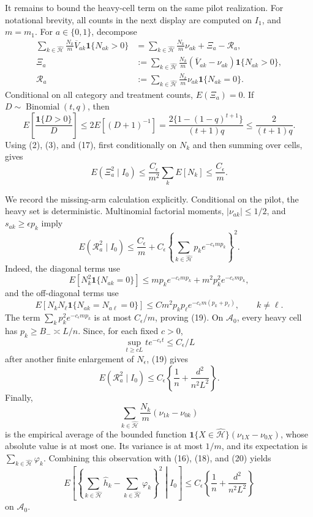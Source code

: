 It remains to bound the heavy-cell term on the same pilot realization.  For notational brevity, all counts in the next display are computed on \(I_1\), and \(m=m_1\).  For \(a\in\{0,1\}\), decompose
\[
 \begin{aligned}
 \sum_{k\in\widehat{\mathcal H}}\frac{N_k}{m}\overline V_{ak}
       \mathbf 1\{N_{ak}>0\}
 &=\sum_{k\in\widehat{\mathcal H}}\frac{N_k}{m}\nu_{ak}
   +\Xi_a-\mathcal R_a,\\
 \Xi_a&:=\sum_{k\in\widehat{\mathcal H}}\frac{N_k}{m}
   (\overline V_{ak}-\nu_{ak})\mathbf 1\{N_{ak}>0\},\\
 \mathcal R_a&:=\sum_{k\in\widehat{\mathcal H}}\frac{N_k}{m}
   \nu_{ak}\mathbf 1\{N_{ak}=0\}.
 \end{aligned}                                                                  \tag{16}
\]
Conditional on all category and treatment counts, \(E(\Xi_a)=0\).  If \(D\sim\operatorname{Binomial}(t,q)\), then
\[
 E\left[\frac{\mathbf 1\{D>0\}}D\right]
 \le2E[(D+1)^{-1}]
 =\frac{2\{1-(1-q)^{t+1}\}}{(t+1)q}
 \le\frac{2}{(t+1)q}.                                                          \tag{17}
\]
Using (2), (3), and (17), first conditionally on \(N_k\) and then summing over cells, gives
\[
 E(\Xi_a^2\mid I_0)
 \le \frac{C_\epsilon}{m^2}\sum_kE[N_k]
 \le\frac{C_\epsilon}{m}.                                                       \tag{18}
\]

We record the missing-arm calculation explicitly.  Conditional on the pilot, the heavy set is deterministic.  Multinomial factorial moments, \(|\nu_{ak}|\le1/2\), and \(s_{ak}\ge\epsilon p_k\) imply
\[
 E(\mathcal R_a^2\mid I_0)
 \le \frac{C_\epsilon}{m}
 +C_\epsilon\left\{\sum_{k\in\widehat{\mathcal H}}
 p_ke^{-c_\epsilon mp_k}\right\}^2.                                            \tag{19}
\]
Indeed, the diagonal terms use
\[
 E[N_k^2\mathbf 1\{N_{ak}=0\}]
 \le mp_ke^{-c_\epsilon mp_k}+m^2p_k^2e^{-c_\epsilon mp_k},
\]
and the off-diagonal terms use
\[
 E[N_kN_\ell\mathbf 1\{N_{ak}=N_{a\ell}=0\}]
 \le C m^2p_kp_\ell e^{-c_\epsilon m(p_k+p_\ell)},\qquad k\ne\ell.
\]
The term \(\sum_kp_k^2e^{-c_\epsilon mp_k}\) is at most \(C_\epsilon/m\), proving (19).  On \(\mathcal A_0\), every heavy cell has \(p_k\ge B_-\asymp L/n\).  Since, for each fixed \(c>0\),
\[
 \sup_{t\ge cL} t e^{-c_\epsilon t}\le C_\epsilon/L
\]
after another finite enlargement of \(N_\epsilon\), (19) gives
\[
 E(\mathcal R_a^2\mid I_0)
 \le C_\epsilon\left\{\frac1n+\frac{d^2}{n^2L^2}\right\}.                   \tag{20}
\]
Finally,
\[
 \sum_{k\in\widehat{\mathcal H}}\frac{N_k}{m}
 (\nu_{1k}-\nu_{0k})
\]
is the empirical average of the bounded function
\(\mathbf 1\{X\in\widehat{\mathcal H}\}(\nu_{1X}-\nu_{0X})\), whose absolute value is at most one.  Its variance is at most \(1/m\), and its expectation is \(\sum_{k\in\widehat{\mathcal H}}\varphi_k\).  Combining this observation with (16), (18), and (20) yields
\[
 E\left[\left\{\sum_{k\in\widehat{\mathcal H}}\widehat h_k
       -\sum_{k\in\widehat{\mathcal H}}\varphi_k\right\}^2
       \middle| I_0\right]
 \le C_\epsilon\left\{\frac1n+\frac{d^2}{n^2L^2}\right\}                  \tag{21}
\]
on \(\mathcal A_0\).

